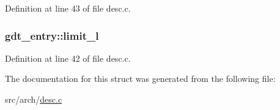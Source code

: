 Definition at line 43 of file desc.\+c.

\hypertarget{structgdt__entry_aac421dd71cee241d3c91179d679e477c}{
\subsubsection[{limit\+\_\+l}]{ gdt\+\_\+entry\+::limit\+\_\+l}}\label{structgdt__entry_aac421dd71cee241d3c91179d679e477c}


Definition at line 42 of file desc.\+c.



The documentation for this struct was generated from the following file\+:\begin{DoxyCompactItemize}
\item 
src/arch/\hyperlink{desc_8c}{desc.\+c}\end{DoxyCompactItemize}
